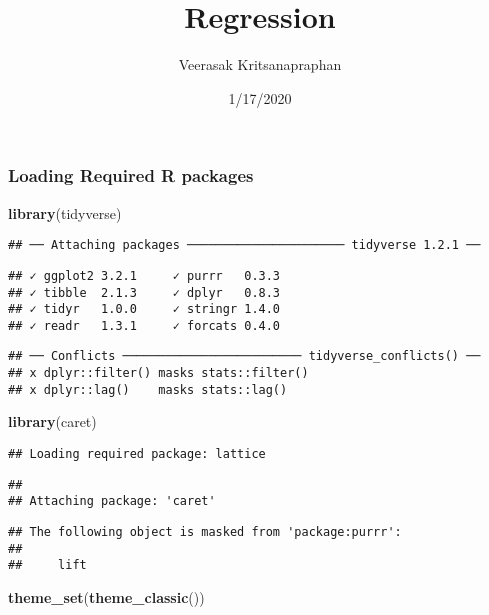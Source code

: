 \documentclass[]{article}
\title{Regression}
\author{Veerasak Kritsanapraphan}
\date{1/17/2020}
\newenvironment{Shaded}{\begin{snugshade}}{\end{snugshade}}
\newcommand{\KeywordTok}[1]{\textcolor[rgb]{0.13,0.29,0.53}{\textbf{#1}}}
\newcommand{\NormalTok}[1]{#1}
\begin{document}
\maketitle

\hypertarget{loading-required-r-packages}{%
\subsubsection{Loading Required R
packages}\label{loading-required-r-packages}}

\begin{Shaded}
\begin{Highlighting}[]
\KeywordTok{library}\NormalTok{(tidyverse)}
\end{Highlighting}
\end{Shaded}

\begin{verbatim}
## ── Attaching packages ────────────────────── tidyverse 1.2.1 ──
\end{verbatim}

\begin{verbatim}
## ✓ ggplot2 3.2.1     ✓ purrr   0.3.3
## ✓ tibble  2.1.3     ✓ dplyr   0.8.3
## ✓ tidyr   1.0.0     ✓ stringr 1.4.0
## ✓ readr   1.3.1     ✓ forcats 0.4.0
\end{verbatim}

\begin{verbatim}
## ── Conflicts ───────────────────────── tidyverse_conflicts() ──
## x dplyr::filter() masks stats::filter()
## x dplyr::lag()    masks stats::lag()
\end{verbatim}

\begin{Shaded}
\begin{Highlighting}[]
\KeywordTok{library}\NormalTok{(caret)}
\end{Highlighting}
\end{Shaded}

\begin{verbatim}
## Loading required package: lattice
\end{verbatim}

\begin{verbatim}
## 
## Attaching package: 'caret'
\end{verbatim}

\begin{verbatim}
## The following object is masked from 'package:purrr':
## 
##     lift
\end{verbatim}

\begin{Shaded}
\begin{Highlighting}[]
\KeywordTok{theme_set}\NormalTok{(}\KeywordTok{theme_classic}\NormalTok{())}
\end{Highlighting}
\end{Shaded}
\end{document}

